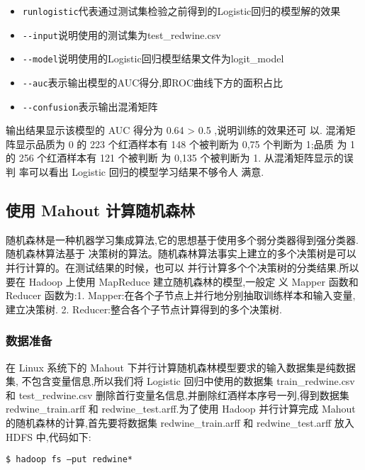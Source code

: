 \begin{itemize}
\item
  \lstinline!runlogistic!代表通过测试集检验之前得到的Logistic回归的模型解的效果
\item
  \lstinline!--input!说明使用的测试集为test\_redwine.csv
\item
  \lstinline!--model!说明使用的Logistic回归模型结果文件为logit\_model
\item
  \lstinline!--auc!表示输出模型的AUC得分,即ROC曲线下方的面积占比
\item
  \lstinline!--confusion!表示输出混淆矩阵
\end{itemize}

输出结果显示该模型的 AUC 得分为 0.64 \textgreater{} 0.5
,说明训练的效果还可 以. 混淆矩阵显示品质为 0 的 223 个红酒样本有 148
个被判断为 0,75 个判断为 1;品质 为 1 的 256 个红酒样本有 121 个被判断 为
0,135 个被判断为 1. 从混淆矩阵显示的误判 率可以看出 Logistic
回归的模型学习结果不够令人 满意.

\subsection{使用 Mahout
计算随机森林}\label{ux4f7fux7528-mahout-ux8ba1ux7b97ux968fux673aux68eeux6797}

随机森林是一种机器学习集成算法,它的思想基于使用多个弱分类器得到强分类器.
随机森林算法基于
决策树的算法。随机森林算法事实上建立的多个决策树是可以并行计算的。在测试结果的时候，也可以
并行计算多个个决策树的分类结果.所以要在 Hadoop 上使用 MapReduce
建立随机森林的模型,一般定 义 Mapper 函数和 Reducer 函数为:1.
Mapper:在各个子节点上并行地分别抽取训练样本和输入变量, 建立决策树. 2.
Reducer:整合各个子节点计算得到的多个决策树.

\subsubsection{数据准备}\label{ux6570ux636eux51c6ux5907-1}

在 Linux 系统下的 Mahout
下并行计算随机森林模型要求的输入数据集是纯数据集,
不包含变量信息,所以我们将 Logistic 回归中使用的数据集 train\_redwine.csv
和 test\_redwine.csv
删除首行变量名信息,并删除红酒样本序号一列,得到数据集 redwine\_train.arff
和 redwine\_test.arff.为了使用 Hadoop 并行计算完成 Mahout
的随机森林的计算,首先要将数据集 redwine\_train.arff 和
redwine\_test.arff 放入 HDFS 中,代码如下:

\begin{lstlisting}
$ hadoop fs –put redwine*
\end{lstlisting}

